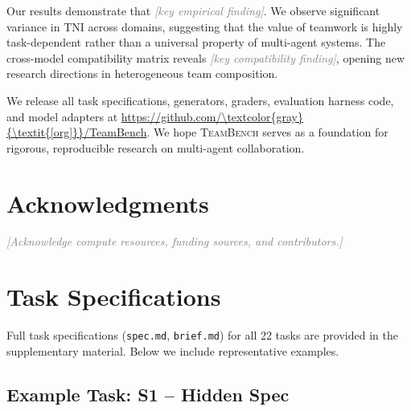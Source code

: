 \documentclass{article}
\newcommand{\teambench}{\textsc{TeamBench}}
\newcommand{\tni}{\textsc{TNI}}
\newcommand{\placeholder}[1]{\textcolor{gray}{\textit{[#1]}}}
\newcommand{\sys}[1]{\texttt{#1}}
\begin{document}
Our results demonstrate that \placeholder{key empirical finding}. We observe
significant variance in \tni{} across domains, suggesting that the value of
teamwork is highly task-dependent rather than a universal property of
multi-agent systems. The cross-model compatibility matrix reveals
\placeholder{key compatibility finding}, opening new research directions in
heterogeneous team composition.

We release all task specifications, generators, graders, evaluation harness
code, and model adapters at \url{https://github.com/\placeholder{org}/TeamBench}.
We hope \teambench{} serves as a foundation for rigorous, reproducible
research on multi-agent collaboration.


\section*{Acknowledgments}

\placeholder{Acknowledge compute resources, funding sources, and contributors.}






\appendix

\section{Task Specifications}
\label{app:tasks}

Full task specifications (\sys{spec.md}, \sys{brief.md}) for all 22 tasks
are provided in the supplementary material. Below we include representative
examples.

\subsection{Example Task: S1 -- Hidden Spec}
\label{app:tasks:s1}
\end{document}
